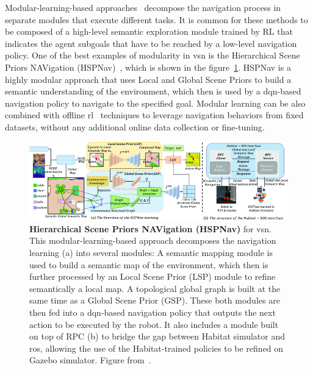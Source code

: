 Modular-learning-based approaches~\cite{chaplot2020, chang2020, skillfusion, Li2023RDDRLAR, zhou2022improving, Cai2024DGMemLV, Wang2023ProbableOL, Wasserman2023ExploitationGuidedEF, Yokoyama2023VLFMVF} decompose the navigation process in separate modules that execute different tasks.
It is common for these methods to be composed of a high-level semantic exploration module trained by \acrshort{RL} that indicates the agent subgoals that have to be reached by a low-level navigation policy.
One of the best examples of modularity in \acrshort{vsn} is the Hierarchical Scene Priors NAVigation (HSPNav)~\cite{Kang2024HSPNavHS}, which is shown in the figure~\ref{fig:modular-learning}.
HSPNav is a highly modular approach that uses Local and Global Scene Priors to build a semantic understanding of the environment, which then is used by a \acrshort{dqn}-based~\cite{mnih2013} navigation policy to navigate to the specified goal.
Modular learning can be also combined with offline \acrshort{rl}~\cite{shah2022} techniques to leverage navigation behaviors from fixed datasets, without any additional online data collection or fine-tuning.

\begin{figure}
    \centering
    \includegraphics[width=\textwidth]{figures/related_work/modular_learning}
    \caption{\textbf{Hierarchical Scene Priors NAVigation (HSPNav)} for \acrlong{vsn}.
    This modular-learning-based approach decomposes the navigation learning (a) into several modules:
    A semantic mapping module is used to build a semantic map of the environment, which then is further processed by an Local Scene Prior (LSP) module to refine semantically a local map.
    A topological global graph is built at the same time as a Global Scene Prior (GSP).
    These both modules are then fed into a \acrshort{dqn}-based navigation policy that outputs the next action to be executed by the robot.
    It also includes a module built on top of RPC (b) to bridge the gap between Habitat simulator and \acrshort{ros}, allowing the use of the Habitat-trained policies to be refined on Gazebo simulator.
    Figure from~\cite{Kang2024HSPNavHS}.}
    \label{fig:modular-learning}
\end{figure}

